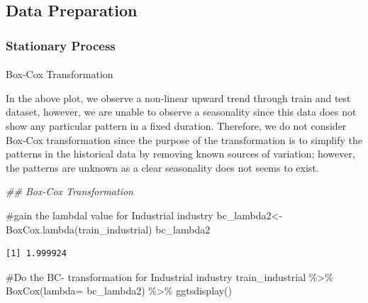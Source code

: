 \documentclass[
  letterpaper,
  DIV=11,
  numbers=noendperiod]{scrartcl}
\makeatletter
\let\oldparagraph\paragraph
\renewcommand{\paragraph}{
    \@ifstar
      \xxxParagraphStar
      \xxxParagraphNoStar
  }
\newcommand{\xxxParagraphStar}[1]{\oldparagraph*{#1}\mbox{}}
\newcommand{\xxxParagraphNoStar}[1]{\oldparagraph{#1}\mbox{}}
\newenvironment{Shaded}{\begin{snugshade}}{\end{snugshade}}
\newcommand{\AttributeTok}[1]{\textcolor[rgb]{0.40,0.45,0.13}{#1}}
\newcommand{\CommentTok}[1]{\textcolor[rgb]{0.37,0.37,0.37}{#1}}
\newcommand{\DocumentationTok}[1]{\textcolor[rgb]{0.37,0.37,0.37}{\textit{#1}}}
\newcommand{\FunctionTok}[1]{\textcolor[rgb]{0.28,0.35,0.67}{#1}}
\newcommand{\NormalTok}[1]{\textcolor[rgb]{0.00,0.23,0.31}{#1}}
\newcommand{\OtherTok}[1]{\textcolor[rgb]{0.00,0.23,0.31}{#1}}
\newcommand{\SpecialCharTok}[1]{\textcolor[rgb]{0.37,0.37,0.37}{#1}}
\makeatother
\begin{document}
\subsection{Data Preparation}\label{data-preparation}

\subsubsection{Stationary Process}\label{stationary-process}

\paragraph{Box-Cox Transformation}\label{box-cox-transformation}

In the above plot, we observe a non-linear upward trend through train
and test dataset, however, we are unable to observe a seasonality since
this data does not show any particular pattern in a fixed duration.
Therefore, we do not consider Box-Cox transformation since the purpose
of the transformation is to simplify the patterns in the historical data
by removing known sources of variation; however, the patterns are
unknown as a clear seasonality does not seems to exist.

\begin{Shaded}
\begin{Highlighting}[]
\DocumentationTok{\#\# Box{-}Cox Transformation}

\CommentTok{\#gain the lambdal value for Industrial industry}
\NormalTok{bc\_lambda2}\OtherTok{\textless{}{-}} \FunctionTok{BoxCox.lambda}\NormalTok{(train\_industrial)}
\NormalTok{bc\_lambda2}
\end{Highlighting}
\end{Shaded}

\begin{verbatim}
[1] 1.999924
\end{verbatim}

\begin{Shaded}
\begin{Highlighting}[]
\CommentTok{\#Do the BC{-} transformation for Industrial industry}
\NormalTok{train\_industrial }\SpecialCharTok{\%\textgreater{}\%}  \FunctionTok{BoxCox}\NormalTok{(}\AttributeTok{lambda=}\NormalTok{ bc\_lambda2) }\SpecialCharTok{\%\textgreater{}\%} \FunctionTok{ggtsdisplay}\NormalTok{()}
\end{Highlighting}
\end{Shaded}
\end{document}

